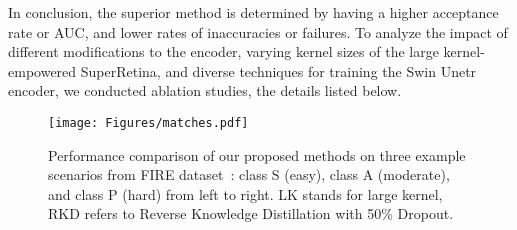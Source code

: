 \documentclass[10pt,twocolumn,letterpaper]{article}
\begin{document}
In conclusion, the superior method is determined by having a higher acceptance rate or AUC, and lower rates of inaccuracies or failures.
To analyze the impact of different modifications to the encoder, varying kernel sizes of the large kernel-empowered SuperRetina, and diverse techniques for training the Swin Unetr encoder, we conducted ablation studies, the details listed below.

\begin{figure*}
  \centering
  \texttt{[image: Figures/matches.pdf]}
\vspace{-1cm}
  \caption{Performance comparison of our proposed methods on three example scenarios from FIRE dataset~\cite{hernandez2017fire}: class S (easy), class A (moderate), and class P (hard) from left to right. LK stands for large kernel, RKD refers to Reverse Knowledge Distillation with 50\% Dropout.}
  \label{matches}
\end{figure*}
\end{document}
